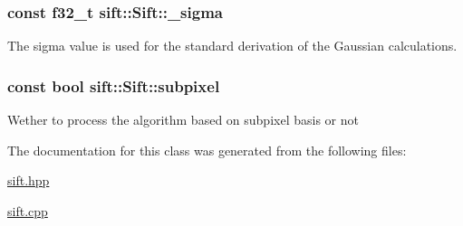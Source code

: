\subsubsection[{\+\_\+sigma}]{\setlength{\rightskip}{0pt plus 5cm}const {\bf f32\+\_\+t} sift\+::\+Sift\+::\+\_\+sigma\hspace{0.3cm}{\ttfamily [private]}}\label{classsift_1_1Sift_a29f9dbb5de3aaed524aebaa6cddc4d50}
The sigma value is used for the standard derivation of the Gaussian calculations. \hypertarget{classsift_1_1Sift_ab083661626a1f1f50ceafaf3134f573d}{}
\subsubsection[{subpixel}]{\setlength{\rightskip}{0pt plus 5cm}const bool sift\+::\+Sift\+::subpixel}\label{classsift_1_1Sift_ab083661626a1f1f50ceafaf3134f573d}
Wether to process the algorithm based on subpixel basis or not 

The documentation for this class was generated from the following files\+:\begin{DoxyCompactItemize}
\item 
\hyperlink{sift_8hpp}{sift.\+hpp}\item 
\hyperlink{sift_8cpp}{sift.\+cpp}\end{DoxyCompactItemize}
